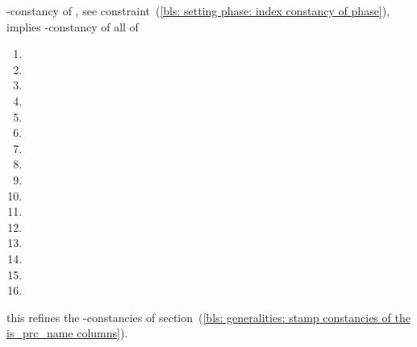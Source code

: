 \saNote{} \label{bls: setting phase: index constancy of data and result flags}
\blsIndex{}-constancy of \blsPhase{},
see constraint~(\ref{bls: setting phase: index constancy of phase}),
implies \blsIndex{}-constancy of all of
\begin{multicols}{2}
	\begin{enumerate}
		\item \isPointEvaluationData
		\item \isBlsGOneAddData
		\item \isBlsGOneMsmData
		\item \isBlsGTwoAddData
		\item \isBlsGTwoMsmData
		\item \isBlsPairingCheckData
		\item \isBlsMapFpToGOneData
		\item \isBlsMapFpTwoToGTwoData
		\item \isPointEvaluationResult
		\item \isBlsGOneAddResult
		\item \isBlsGOneMsmResult
		\item \isBlsGTwoAddResult
		\item \isBlsGTwoMsmResult
		\item \isBlsPairingCheckResult
		\item \isBlsMapFpToGOneResult
		\item \isBlsMapFpTwoToGTwoResult
	\end{enumerate}
\end{multicols}
\noindent this refines the \blsStamp{}-constancies of
section~(\ref{bls: generalities: stamp constancies of the is_prc_name columns}).